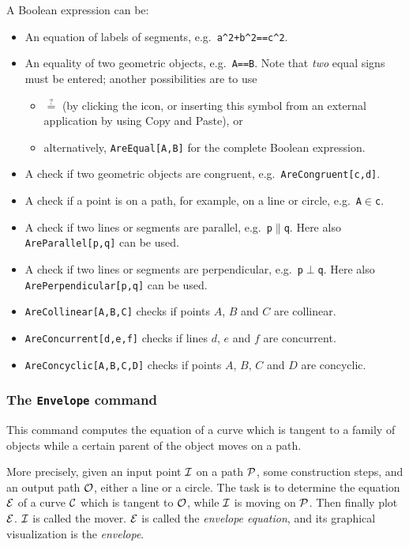 \documentclass{article}
\begin{document}
A Boolean expression can be:
\begin{itemize}
\item An equation of labels of segments, e.g.~\texttt{a\^{}2+b\^{}2==c\^{}2}.
\item An equality of two geometric objects, e.g.~\texttt{A==B}. Note that \textit{two} equal signs must be entered; another possibilities are to use
\begin{itemize}
    \item $\stackrel{?}{=}$ (by clicking the \framebox{$\alpha$} icon, or inserting this symbol from an external application by using Copy and Paste), or
    \item alternatively, \texttt{AreEqual[A,B]} for the complete Boolean expression.
\end{itemize}
\item A check if two geometric objects are congruent, e.g.~\texttt{AreCongruent[c,d]}.
\item A check if a point is on a path, for example, on a line or circle, e.g.~\texttt{A$\in$c}.
\item A check if two lines or segments are parallel, e.g.~\texttt{p$\parallel$q}. Here also \texttt{AreParallel[p,q]} can be used.
\item A check if two lines or segments are perpendicular, e.g.~\texttt{p$\perp$q}. Here also \texttt{ArePerpendicular[p,q]} can be used.
\item \texttt{AreCollinear[A,B,C]} checks if points $A$, $B$ and $C$ are collinear.
\item \texttt{AreConcurrent[d,e,f]} checks if lines $d$, $e$ and $f$ are concurrent.
\item \texttt{AreConcyclic[A,B,C,D]} checks if points $A$, $B$, $C$ and $D$ are concyclic.
\end{itemize}

\subsubsection{The \texttt{Envelope} command}

This command computes the equation of a curve which is tangent to a family of objects while a certain parent of the object moves on a path.

More precisely, given an input point $\cal{I}$ on a path $\cal{P}$, some construction steps, and an output path $\cal O$, either a line or a circle. The task is to determine the equation $\cal E$ of a curve $\cal C$ which is tangent to $\cal O$, while $\cal I$ is moving on $\cal P$. Then finally plot $\cal E$. $\cal I$ is called the mover. $\cal E$ is called the \textit{envelope equation}, and its graphical visualization is the \textit{envelope}.
\end{document}
